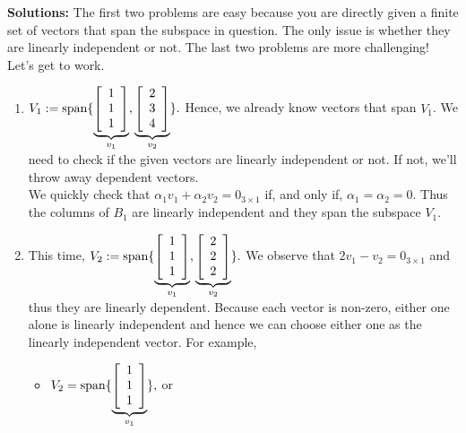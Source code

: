 \textbf{Solutions:}  The first two problems are easy because you are directly given a finite set of vectors that span the subspace in question. The only issue is whether they are linearly independent or not. The last two problems are more challenging! Let's get to work.

\begin{enumerate}
\renewcommand{\labelenumi}{(\alph{enumi})}
\setlength{\itemsep}{.1cm}

\item $V_1 :=  \mathrm{span} \{  \underbrace{\left[\begin{array}{c} 1 \\1  \\ 1 \end{array}\right] }_{v_1}, \underbrace{ \left[\begin{array}{c}  2\\ 3 \\ 4\end{array}\right] }_{v_2}  \}.$ Hence, we already know vectors that span $V_1$. We need to check if the given vectors are linearly independent or not. If not, we'll throw away dependent vectors. \\

We quickly check that $\alpha_1 v_1 + \alpha_2 v_2 = 0_{3 \times 1}$
if, and only if, $\alpha_1 = \alpha_2 = 0$. Thus the columns of $B_1$ are linearly independent and they span the subspace $V_1$.

\item This time, $V_2 := \mathrm{span} \{  \underbrace{\left[\begin{array}{c} 1 \\ 1  \\
1 \end{array}\right]}_{v_1}, \underbrace{ \left[\begin{array}{c}  2\\  2 \\
 2\end{array}\right] }_{v_2}  \}.$ We observe that $2 v_1 - v_2 = 0_{3 \times 1}$ and thus they are linearly dependent. Because each vector is non-zero, either one alone is linearly independent and hence we can choose either one as the linearly independent vector. For example,
\begin{itemize}
    \item $V_2 = \mathrm{span} \{ \underbrace{\left[\begin{array}{c} 1 \\
1  \\
1 \end{array}\right]}_{v_1}  \},$ or


\end{itemize}
\end{enumerate}

